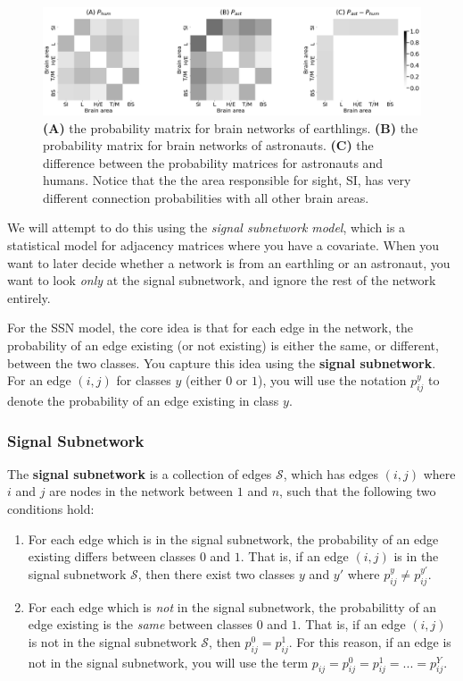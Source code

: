 \begin{figure}
    \centering
    \includegraphics[width=\linewidth]{representations/ch5/Images/ssg_pmtxs.png}
    \caption[Probability matrices from two different classes]{\textbf{(A)} the probability matrix for brain networks of earthlings. \textbf{(B)} the probability matrix for brain networks of astronauts. \textbf{(C)} the difference between the probability matrices for astronauts and humans. Notice that the the area responsible for sight, SI, has very different connection probabilities with all other brain areas.}
    \label{fig:ch5:ssg_pmtxs}
\end{figure}

We will attempt to do this using the \textit{signal subnetwork model}, which is a statistical model for adjacency matrices where you have a covariate. When you want to later decide whether a network is from an earthling or an astronaut, you want to look \textit{only} at the signal subnetwork, and ignore the rest of the network entirely.

For the SSN model, the core idea is that for each edge in the network, the probability of an edge existing (or not existing) is either the same, or different, between the two classes. You capture this idea using the \textbf{signal subnetwork}. For an edge $(i, j)$ for classes $y$ (either $0$ or $1$), you will use the notation $p_{ij}^y$ to denote the probability of an edge existing in class $y$. 

\subsubsection{Signal Subnetwork}

The \textbf{signal subnetwork} \cite{Vogelstein2013Jul} is a collection of edges $\mathcal S$, which has edges $(i,j)$ where $i$ and $j$ are nodes in the network between $1$ and $n$, such that the following two conditions hold:

\begin{enumerate}
    \item For each edge which is in the signal subnetwork, the probability of an edge existing differs between classes $0$ and $1$. That is, if an edge $(i, j)$ is in the signal subnetwork $\mathcal S$, then there exist two classes $y$ and $y'$ where $p_{ij}^{y} \neq p_{ij}^{y'}$.
    \item For each edge which is \textit{not} in the signal subnetwork, the probabilitty of an edge existing is the \textit{same} between classes $0$ and $1$. That is, if an edge $(i, j)$ is not in the signal subnetwork $\mathcal S$, then $p_{ij}^0 = p_{ij}^1$. For this reason, if an edge is not in the signal subnetwork, you will use the term $p_{ij} = p_{ij}^0 = p_{ij}^1 = ... = p_{ij}^Y$.
\end{enumerate}

